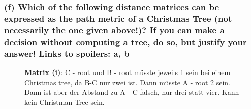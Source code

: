 \subsubsection*{(f) Which of the following distance matrices can be expressed as the path metric of a Christmas Tree
(not necessarily the one given above!)? If you can make a decision without computing a tree, do
so, but justify your answer! Links to spoilers: a, b}

\begin{figure}[H]
    \centering
    \caption{\textbf{Matrix (i)}: C - root und B - root müsste jeweils 1 sein bei einem Christmas tree, da B-C nur zwei ist. Dann müsste A - root 2 sein. Dann ist aber der Abstand zu A - C falsch, nur drei statt vier. Kann kein Christman Tree sein. }
\end{figure}

